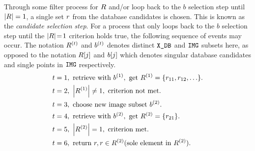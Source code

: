 Through some filter process for $R$ and/or loop back to the $b$ selection step until $\left| R \right| = 1$, a single set $r$ from the database candidates is  chosen.
This is known as the \emph{candidate selection step}.
For a process that only loops back to the $b$ selection step until the $|R| \!=\! 1$ criterion holds true, the following sequence of events may occur.
The notation $R^{(t)}$ and $b^{(t)}$ denotes distinct $\texttt{X\_DB}$ and $\texttt{IMG}$ subsets here, as opposed to the notation $R[j]$ and $b[j]$ which denotes singular database candidates and single points in $\texttt{IMG}$ respectively.
\begin{align*}
    &t = 1, \text{ retrieve with } b^{(1)}, \text{ get } R^{(1)} = \{r_{11}, r_{12}, \ldots\}. \\
    &t = 2, \ \left|  R^{(1)}  \right| \neq 1, \text{ criterion not met. } \\
    &t = 3, \text{ choose new image subset } b^{(2)}. \\
    &t = 4, \text{ retrieve with } b^{(2)}, \text{ get } R^{(2)} = \{r_{21}\}. \\
    &t = 5, \ \left|  R^{(2)}  \right| = 1, \text{ criterion met. } \\
    &t = 6, \text{ return } r, r \in R^{(2)} (\text{sole element in } R^{(2)} ).
\end{align*}

